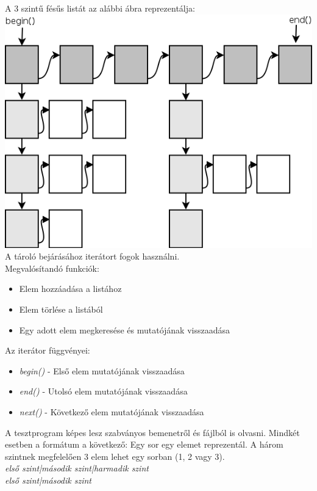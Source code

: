 \documentclass[11pt,a4paper]{article}
\begin{document}
\newpage
A 3 szintű fésűs listát az alábbi ábra reprezentálja:\\
\newline
\includegraphics[scale=0.6]{data_structure.png}
\\
\newline
A tároló bejárásához iterátort fogok használni.\\
\newline
Megvalósítandó funkciók:
\begin{itemize}
\item Elem hozzáadása a listához
\item Elem törlése a listából
\item Egy adott elem megkeresése és mutatójának visszaadása\\
\end{itemize}
Az iterátor függvényei:
\begin{itemize}
\item \emph{begin()} - Első elem mutatójának visszaadása
\item \emph{end()} - Utolsó elem mutatójának visszaadása
\item \emph{next()} - Következő elem mutatójának visszaadása\\
\end{itemize}

A tesztprogram képes lesz szabványos bemenetről és fájlból is olvasni.
Mindkét esetben a formátum a következő:
Egy sor egy elemet reprezentál. A három szintnek megfelelően 3 elem
lehet egy sorban (1, 2 vagy 3).\\
\emph{első szint|második szint|harmadik szint\\}
\emph{első szint|második szint\\}
\end{document}
